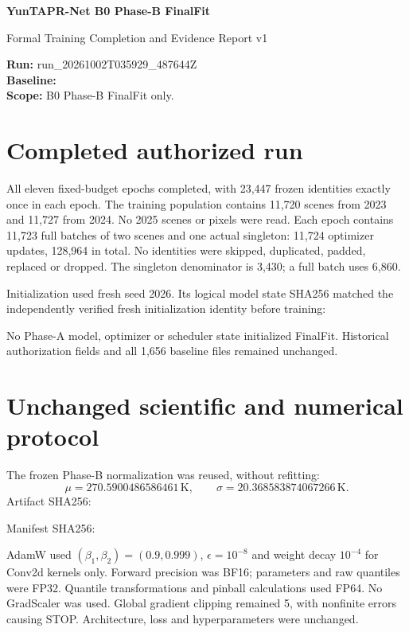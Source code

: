 \documentclass[10pt,a4paper]{article}
\begin{document}
\begin{center}
{\Large\bfseries YunTAPR-Net B0 Phase-B FinalFit}\par
{\large Formal Training Completion and Evidence Report v1}
\end{center}
\textbf{Run:} run\_20261002T035929\_487644Z\\
\textbf{Baseline:} \\
\textbf{Scope:} B0 Phase-B FinalFit only.

\section*{Completed authorized run}
All eleven fixed-budget epochs completed, with 23,447 frozen identities exactly
once in each epoch. The training population contains 11,720 scenes from 2023 and
11,727 from 2024. No 2025 scenes or pixels were read. Each epoch contains 11,723
full batches of two scenes and one actual singleton: 11,724 optimizer updates,
128,964 in total. No identities were skipped, duplicated, padded, replaced or
dropped. The singleton denominator is 3,430; a full batch uses 6,860.

Initialization used fresh seed 2026. Its logical model state SHA256 matched the
independently verified fresh initialization identity before training:
\begin{quote}\small{}\end{quote}
No Phase-A model, optimizer or scheduler state initialized FinalFit. Historical
authorization fields and all 1,656 baseline files remained unchanged.

\section*{Unchanged scientific and numerical protocol}
The frozen Phase-B normalization was reused, without refitting:
\[
\mu=270.5900486586461\,\mathrm{K},\qquad
\sigma=20.368583874067266\,\mathrm{K}.
\]
Artifact SHA256:
\begin{quote}\small{}\end{quote}
Manifest SHA256:
\begin{quote}\small{}\end{quote}
AdamW used $(\beta_1,\beta_2)=(0.9,0.999)$, $\epsilon=10^{-8}$ and weight decay
$10^{-4}$ for Conv2d kernels only. Forward precision was BF16; parameters and
raw quantiles were FP32. Quantile transformations and pinball calculations used
FP64. No GradScaler was used. Global gradient clipping remained 5, with nonfinite
errors causing STOP. Architecture, loss and hyperparameters were unchanged.
\end{document}
